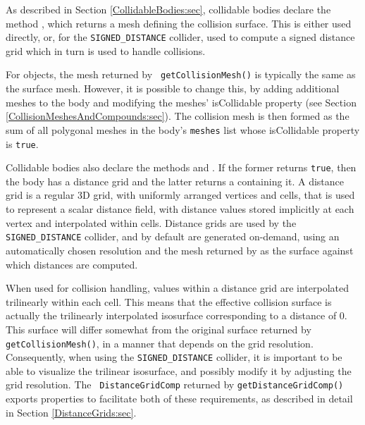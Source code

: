 As described in Section \ref{CollidableBodies:sec}, collidable bodies
declare the method
,
which returns a mesh defining the collision surface.  This is either
used directly, or, for the {\tt SIGNED\_DISTANCE} collider, used
to compute a signed distance grid which in turn is used to handle
collisions.

For  objects, the mesh returned by {\tt
getCollisionMesh()} is typically the same as the surface mesh.
However, it is possible to change this, by adding additional meshes to
the body and modifying the meshes' {\sf isCollidable} property (see
Section
\ref{CollisionMeshesAndCompounds:sec}). The collision mesh is then formed
as the sum of all polygonal meshes in the body's {\tt meshes} list
whose {\sf isCollidable} property is {\tt true}.

Collidable bodies also declare the methods
and
.
If the former returns {\tt true}, then the body has a distance grid
and the latter returns a 
containing it.  A distance grid is a regular 3D grid, with uniformly
arranged vertices and cells, that is used to represent a scalar
distance field, with distance values stored implicitly at each vertex
and interpolated within cells. Distance grids are used by the {\tt
SIGNED\_DISTANCE} collider, and by default are generated
on-demand, using an automatically chosen resolution and the mesh
returned by
as the surface against which distances are computed.

When used for collision handling, values within a distance grid are
interpolated trilinearly within each cell. This means that the
effective collision surface is actually the trilinearly interpolated
isosurface corresponding to a distance of 0. This surface will differ
somewhat from the original surface returned by {\tt
getCollisionMesh()}, in a manner that depends on the grid resolution.
Consequently, when using the {\tt SIGNED\_DISTANCE} collider, it
is important to be able to visualize the trilinear isosurface, and
possibly modify it by adjusting the grid resolution. The {\tt
DistanceGridComp} returned by {\tt getDistanceGridComp()} exports
properties to facilitate both of these requirements, as described in
detail in Section \ref{DistanceGrids:sec}.

